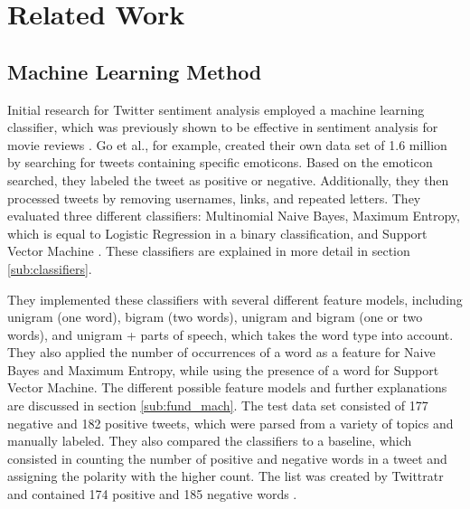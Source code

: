 \chapter{Related Work}
\label{cha:Chapter2_RelatedWork}
\iffalse

Length: 1-2 pages

Effort: ~2 weeks

2-3 Arbeiten maximal, die genauer betrachtet werden
Ruhig mehr Zitate --> aber nicht detailliert betrachten
Introduction to Data Mining --> zu generell, nur als Zitat
Hier nur im engsten Sinne


Content
\begin{itemize}
\item Alec Go, Richa Bhayani, and Lei Huang. 2009. Twitter Sentiment Classification Using Distant Supeusedrvision.
Technical Report. Standford.
\item Taboada or Serendio or Vader?
\item Khuc et al.
\end{itemize}

\fi

\section{Machine Learning Method}
\label{sub:related_ml}
Initial research for Twitter sentiment analysis employed a machine learning classifier, which was previously shown to be effective in sentiment analysis for movie reviews \cite{GoBHaHua2009}. Go et al., for example, created their own data set of 1.6 million by searching for tweets containing specific emoticons. Based on the emoticon searched, they labeled the tweet as positive or negative. Additionally, they then processed tweets by removing usernames, links, and repeated letters. They evaluated three different classifiers: Multinomial Naive Bayes, Maximum Entropy, which is equal to Logistic Regression in a binary classification, and Support Vector Machine \cite{GoBHaHua2009}. These classifiers are explained in more detail in section \ref{sub:classifiers}.

They implemented these classifiers with several different feature models, including unigram (one word), bigram (two words), unigram and bigram (one or two words), and unigram + parts of speech, which takes the word type into account. They also applied the number of occurrences of a word as a feature for Naive Bayes and Maximum Entropy, while using the presence of a word for Support Vector Machine. The different possible feature models and further explanations are discussed in section \ref{sub:fund_mach}. The test data set consisted of 177 negative and 182 positive tweets, which were parsed from a variety of topics and manually labeled. They also compared the classifiers to a baseline, which consisted in counting the number of positive and negative words in a tweet and assigning the polarity with the higher count. The list was created by Twittratr and contained 174 positive and 185 negative words \cite{GoBHaHua2009}. 

